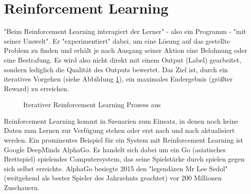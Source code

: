 \section{Reinforcement Learning}\label{sec:rl1}
"Beim Reinforcement Learning interagiert der Lerner" - also ein Programm - "mit seiner Umwelt"\citep[S.~45; eigene Übersetzung]{settles_active_2010}. Er "experimentiert" dabei, um eine Lösung auf das gestellte Problem zu finden und erhält je nach Ausgang seiner Aktion eine Belohnung oder eine Bestrafung.\citep[S.~331]{kubat_introduction_2017} Es wird also nicht direkt mit einem Output (Label) gearbeitet, sondern lediglich die Qualität des Outputs bewertet. Das Ziel ist, durch ein iteratives Vorgehen (siehe Abbildung \ref{fig:reinforcementLearning}), ein maximales Endergebnis (größter Reward) zu erreichen.\citep[S.~69]{swamynathan_mastering_2017}
\begin{figure}[H]
\centering
{}
\caption{Iterativer Reinforcement Learning Prozess aus \citep[S.~25]{lison_introduction_2012}}
\label{fig:reinforcementLearning}
\end{figure}
Reinforcement Learning kommt in Szenarien zum Einsatz, in denen noch keine Daten zum Lernen zur Verfügung stehen oder erst nach und nach aktualisiert werden.\citep[S.~223]{ramasubramanian_machine_2017}\newline
Ein prominentes Beispiel für ein System mit Reinforcement Learning ist Google DeepMinds AlphaGo. Es handelt sich dabei um ein Go (asiatisches Brettspiel) spielendes Computersystem, das seine Spielstärke durch spielen gegen sich selbst erreichte.\citep{silver_mastering_2017} AlphaGo besiegte 2015 den "legendären Mr Lee Sedol" (weitgehend als bester Spieler des Jahrzehnts geachtet) vor 200 Millionen Zuschauern.\citep{deepmind_alphago_2017}


